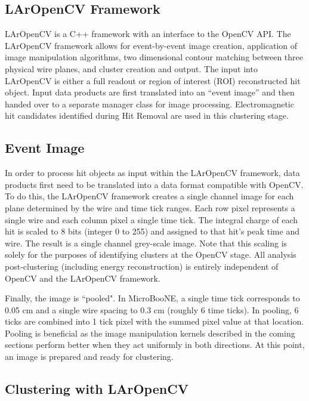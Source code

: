 \subsection{LArOpenCV Framework}
LArOpenCV is a C++ framework with an interface to the OpenCV API. The LArOpenCV framework allows for event-by-event image creation, application of image manipulation algorithms, two dimensional contour matching between three physical wire planes, and cluster creation and output. The input into LArOpenCV is either a full readout or region of interest (ROI) reconstructed hit object. Input data products are first translated into an ``event image'' and then handed over to a separate manager class for image processing. Electromagnetic hit candidates identified during Hit Removal are used in this clustering stage. 

\subsection{Event Image}
\par In order to process hit objects as input within the LArOpenCV framework, data products first need to be translated into a data format compatible with OpenCV. To do this, the LArOpenCV framework creates a single channel image for each plane determined by the wire and time tick ranges. Each row pixel represents a single wire and each column pixel a single time tick. The integral charge of each hit is scaled to 8 bits (integer 0 to 255) and assigned to that hit's peak time and wire. The result is a single channel grey-scale image. Note that this scaling is solely for the purposes of identifying clusters at the OpenCV stage. All analysis post-clustering (including energy reconstruction) is entirely independent of OpenCV and the LArOpenCV framework. 
\par Finally, the image is ``pooled". In MicroBooNE, a single time tick corresponds to 0.05 cm and a single wire spacing to 0.3 cm (roughly 6 time ticks).  In pooling, 6 ticks are combined into 1 tick pixel with the summed pixel value at that location.  Pooling is beneficial as the image manipulation kernels described in the coming sections perform better when they act uniformly in both directions. At this point, an image is prepared and ready for clustering.

\subsection{Clustering with LArOpenCV }


